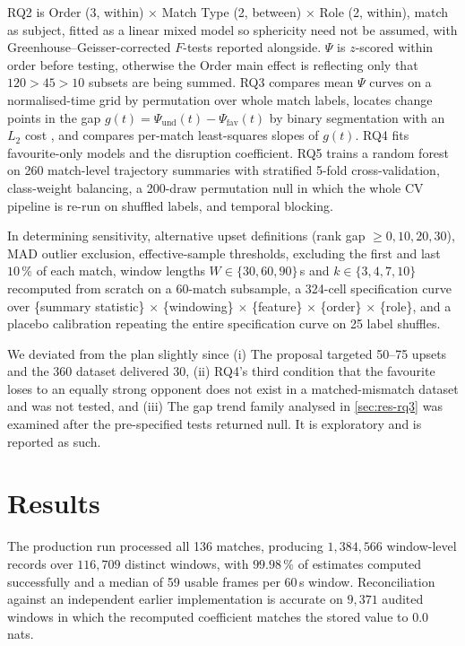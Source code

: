 \documentclass[11pt,a4paper]{article}
\begin{document}
RQ2 is Order (3, within) $\times$ Match Type (2, between) $\times$ Role (2, within), match
as subject, fitted as a linear mixed model so sphericity need not be assumed, with
Greenhouse--Geisser-corrected $F$-tests reported alongside. $\Psi$ is $z$-scored
within order before testing, otherwise the Order main effect is reflecting only that $120>45>10$ subsets are being summed. RQ3 compares mean
$\Psi$ curves on a normalised-time grid by permutation over whole match labels, locates
change points in the gap $g(t)=\Psi_{\text{und}}(t)-\Psi_{\text{fav}}(t)$ by binary
segmentation with an $L_2$ cost \cite{killick2012}, and compares per-match least-squares
slopes of $g(t)$. RQ4 fits favourite-only models and the disruption coefficient. RQ5 trains
a random forest on 260 match-level trajectory summaries with stratified 5-fold
cross-validation, class-weight balancing, a 200-draw permutation null in which the whole
CV pipeline is re-run on shuffled labels, and temporal blocking.

In determining sensitivity, alternative upset definitions (rank gap $\ge0,10,20,30$), MAD
outlier exclusion, effective-sample thresholds, excluding the first and last $10\,\%$ of
each match, window lengths $W\in\{30,60,90\}$\,s and $k\in\{3,4,7,10\}$ recomputed from
scratch on a 60-match subsample, a 324-cell specification curve \cite{simonsohn2020} over
\{summary statistic\} $\times$ \{windowing\} $\times$ \{feature\} $\times$ \{order\}
$\times$ \{role\}, and a placebo calibration repeating the entire specification curve on 25
label shuffles.

We deviated from the plan slightly since (i) The proposal targeted
50--75 upsets and the 360 dataset delivered 30, (ii) RQ4's third condition that the favourite loses
to an equally strong opponent does not exist in a matched-mismatch dataset and was not
tested, and (iii) The gap trend family analysed in \cref{sec:res-rq3} was examined
after the pre-specified tests returned null. It is exploratory and is reported as
such.

\section{Results}
\label{sec:results}

The production run processed all 136 matches, producing $1{,}384{,}566$ window-level
records over $116{,}709$ distinct windows, with $99.98\,\%$ of estimates computed
successfully and a median of 59 usable frames per 60\,s window. Reconciliation against an
independent earlier implementation is accurate on $9{,}371$ audited windows in which the recomputed
coefficient matches the stored value to $0.0$ nats.
\end{document}
